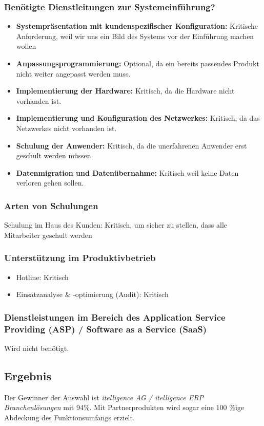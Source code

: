 \subsubsection{Benötigte Dienstleitungen zur Systemeinführung?}
\begin{itemize}
	\item \textbf{Systempräsentation mit kundenspezifischer Konfiguration:} Kritische Anforderung, weil wir uns ein Bild des Systems vor der Einführung machen wollen
	\item \textbf{Anpassungsprogrammierung:} Optional, da ein bereits passendes Produkt nicht weiter angepasst werden muss.
	\item \textbf{Implementierung der Hardware:} Kritisch, da die Hardware nicht vorhanden ist.
	\item \textbf{Implementierung und Konfiguration des Netzwerkes:} Kritisch, da das Netzwerkes nicht vorhanden ist.
	\item \textbf{Schulung der Anwender:} Kritisch, da die unerfahrenen Anwender erst geschult werden müssen.
	\item \textbf{Datenmigration und Datenübernahme:} Kritisch weil keine Daten verloren gehen sollen.
\end{itemize}
\subsubsection{Arten von Schulungen}
Schulung im Haus des Kunden: Kritisch, um sicher zu stellen, dass alle Mitarbeiter geschult werden

\subsubsection{Unterstützung im Produktivbetrieb}
\begin{itemize}
	\item Hotline: Kritisch
	\item Einsatzanalyse \& -optimierung (Audit): Kritisch
\end{itemize}

\subsubsection{Dienstleistungen im Bereich des Application Service Providing (ASP) / Software as a Service (SaaS)}
Wird nicht benötigt.
\newpage
\subsection{Ergebnis}
Der Gewinner der Auswahl ist \textit{itelligence AG / itelligence ERP Branchenlösungen} mit 94\%. Mit Partnerprodukten wird sogar eine 100 \%ige Abdeckung des Funktionsumfangs erzielt. 

